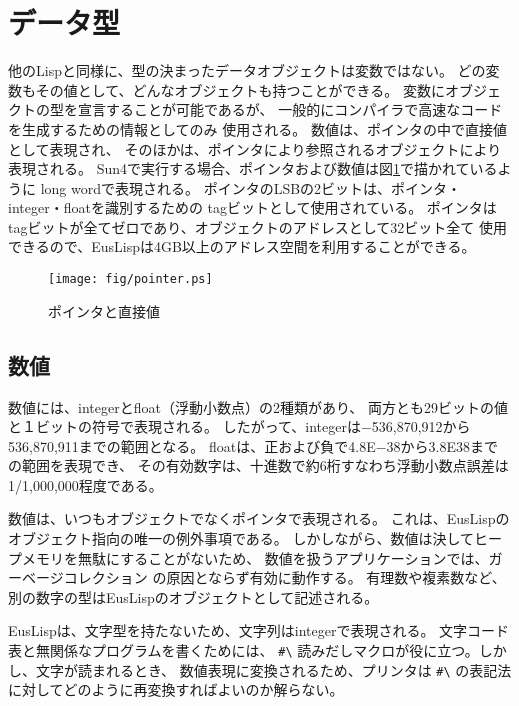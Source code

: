 \section{データ型}
他のLispと同様に、型の決まったデータオブジェクトは変数ではない。
どの変数もその値として、どんなオブジェクトも持つことができる。
変数にオブジェクトの型を宣言することが可能であるが、
一般的にコンパイラで高速なコードを生成するための情報としてのみ
使用される。
数値は、ポインタの中で直接値として表現され、
そのほかは、ポインタにより参照されるオブジェクトにより表現される。
Sun4で実行する場合、ポインタおよび数値は図\ref{Pointer}で描かれているように
long wordで表現される。
ポインタのLSBの2ビットは、ポインタ・integer・floatを識別するための
tagビットとして使用されている。
ポインタはtagビットが全てゼロであり、オブジェクトのアドレスとして32ビット全て
使用できるので、EusLispは4GB以上のアドレス空間を利用することができる。

\begin{figure}[hb]
\begin{center}
\texttt{[image: fig/pointer.ps]}
\end{center}
\caption{\label{Pointer}ポインタと直接値}
\end{figure}

\subsection{数値}
数値には、integerとfloat（浮動小数点）の2種類があり、
両方とも29ビットの値と１ビットの符号で表現される。
したがって、integerは$-$536,870,912から536,870,911までの範囲となる。
floatは、正および負で4.8E$-$38から3.8E38までの範囲を表現でき、
その有効数字は、十進数で約6桁すなわち浮動小数点誤差は1/1,000,000程度である。

数値は、いつもオブジェクトでなくポインタで表現される。
これは、EusLispのオブジェクト指向の唯一の例外事項である。
しかしながら、数値は決してヒープメモリを無駄にすることがないため、
数値を扱うアプリケーションでは、ガーベージコレクション
の原因とならず有効に動作する。
有理数や複素数など、別の数字の型はEusLispのオブジェクトとして記述される。

EusLispは、文字型を持たないため、文字列はintegerで表現される。
文字コード表と無関係なプログラムを書くためには、
\verb+#\+ 読みだしマクロが役に立つ。しかし、文字が読まれるとき、
数値表現に変換されるため、プリンタは
\verb+#\+ の表記法に対してどのように再変換すればよいのか解らない。

